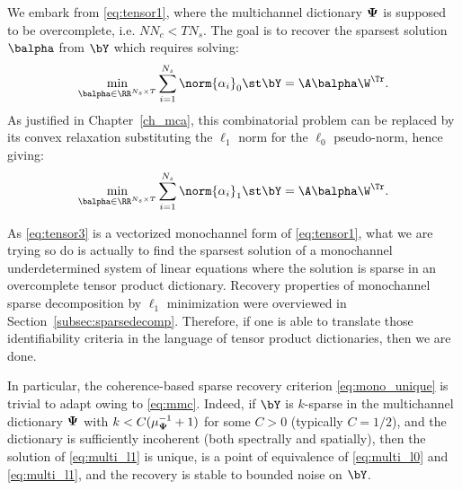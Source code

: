 We embark from \eqref{eq:tensor1}, where the multichannel dictionary ${\bf \Psi}$ is supposed to be overcomplete, i.e. $NN_c < TN_s$. The goal is to recover the sparsest solution $\balpha$ from $\bY$ which requires solving:
\begin{equation}
\label{eq:multi_l0}
\min_{\balpha \in \RR^{N_s \times T}} \sum_{i=1}^{N_s}\norm{\alpha_i}_{0} \st \bY  = \A \balpha \W^\Tr.
\end{equation}
As justified in Chapter~\ref{ch_mca}, this combinatorial problem can be replaced by its convex relaxation substituting the $\ell_1$ norm for the $\ell_0$ pseudo-norm, hence giving:
\begin{equation}
\label{eq:multi_l1}
\min_{\balpha \in \RR^{N_s \times T}} \sum_{i=1}^{N_s}\norm{\alpha_i}_{1} \st \bY  = \A \balpha \W^\Tr.
\end{equation}

As \eqref{eq:tensor3} is a vectorized monochannel form of \eqref{eq:tensor1}, what we are trying so do is actually to find the sparsest solution of a monochannel underdetermined system of linear equations where the solution is sparse in an overcomplete tensor product dictionary. Recovery properties of monochannel sparse decomposition by $\ell_1$ minimization were overviewed in Section~\ref{subsec:sparsedecomp}. Therefore, if one is able to translate those identifiability criteria in the language of tensor product dictionaries, then we are done.

In particular, the coherence-based sparse recovery criterion \eqref{eq:mono_unique} is trivial to adapt owing to \eqref{eq:mmc}. Indeed, if $\bY$ is $k$-sparse in the multichannel dictionary ${\bf \Psi}$ with $k < C(\mu_{{\bf \Psi}}^{-1}+1)$ for some $C > 0$ (typically $C=1/2$), and the dictionary is sufficiently incoherent (both spectrally and spatially), then the solution of \eqref{eq:multi_l1} is unique, is a point of equivalence of \eqref{eq:multi_l0} and \eqref{eq:multi_l1}, and the recovery is stable to bounded noise on $\bY$. 

